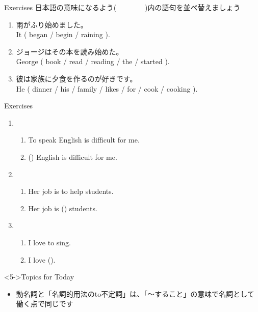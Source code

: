 \documentclass[aspectratio=169,xcolor={dvipsnames,table}]{beamer}
\begin{document}
\begin{frame}[plain]{Exercises}
日本語の意味になるよう(~~~~~~~~)内の語句を並べ替えましょう
\begin{enumerate}
 \item 雨がふり始めました。\\
       It ( began / begin / raining ).\\
 \item ジョージはその本を読み始めた。\\
       George ( book / read / reading / the / started ).\\
 \item 彼は家族に夕食を作るのが好きです。\\
       He ( dinner / his / family / likes / for / cook / cooking ).\\
\end{enumerate}
\end{frame}
\begin{frame}[plain]{Exercises}
 
\begin{enumerate}
 \item \begin{enumerate}
	\item To speak English is difficult for me.
	\item () English is difficult for me.
       \end{enumerate}
 \item  \begin{enumerate}
	\item Her job is to help students.
	\item Her job is () students.
       \end{enumerate}
 \item \begin{enumerate}
	\item I love to sing.
	\item I love ().
       \end{enumerate}
\end{enumerate}

\begin{exampleblock}<5->{Topics for Today}
\begin{itemize}\small
 \item  動名詞と「名詞的用法のto不定詞」は、「〜すること」の意味で名詞として働く点で同じです
\end{itemize}
     \end{exampleblock}
\end{frame}
\end{document}
